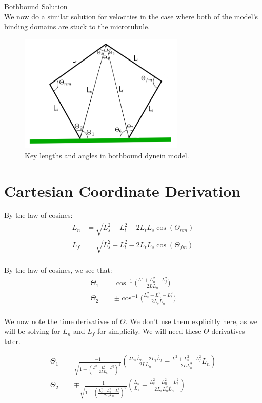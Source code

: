 \documentclass[11pt, landscape]{article}
\begin{document}
\clearpage
{\huge Bothbound Solution} \\
We now do a similar solution for velocities in the case where both of the model's binding domains are stuck to the microtubule.

\begin{figure}[h!]
  \caption{Key lengths and angles in bothbound dynein model.}
  \centering
    \includegraphics[width=0.7\textwidth]{../figures/bothbound_model.png}
\end{figure}

\section{Cartesian Coordinate Derivation}

By the law of cosines:
\begin{align}
  L_n &= \sqrt{L_{s}^2+L_{t}^2-2L_{t}L_{s}\cos(\Theta_{nm})}\\
  L_f &= \sqrt{L_{s}^2+L_{t}^2-2L_{t}L_{s}\cos(\Theta_{fm})}\\
\end{align}

By the law of cosines, we see that:
\begin{align}
  \Theta_{1} &= \cos^{-1}\bigg(\frac{L^2+L_{n}^2-L_{f}^2}{2LL_{n}}\bigg) \\
  \Theta_{2} &= \pm\cos^{-1}\bigg(\frac{L_{s}^2+L_{n}^2-L_{t}^2}{2L_{s}L_{n}}\bigg) \\
\end{align}

We now note the time derivatives of $\Theta$. We don't use them explicitly here, as we will be solving for $\dot{L_n}$ and $\dot{L_f}$ for simplicity. We will need these $\Theta$ derivatives later.

\begin{align}
  \dot{\Theta_1} &= \frac{-1}{\sqrt{1-\left(\frac{L^2+L_{n}^2-L_{f}^2}{2LL_{n}}\right)^2}}\left(\frac{2L_n\dot{L_n} - 2L_f\dot{L_f}}{2LL_n} - \frac{L^2+L_n^2-L_f^2}{2LL_n^2}\dot{L_n}\right)\\
  \dot{\Theta_2} &= \mp \frac{1}{\sqrt{1-\left(\frac{L_{s}^2+L_{n}^2-L_{t}^2}{2L_{s}L_{n}}\right)^2}}\left(\frac{\dot{L}_n}{L_s} - \frac{L_s^2+L_{n}^2-L_t^2}{2L_sL_n^2\dot{L_n}}\right)\\
\end{align}
\end{document}
